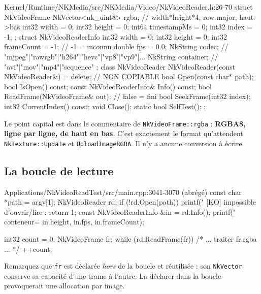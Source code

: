 \begin{nkcode}{Kernel/Runtime/NKMedia/src/NKMedia/Video/NkVideoReader.h:26-70}
    struct NkVideoFrame {
            NkVector<nk_uint8> rgba;         // width*height*4, row-major, haut->bas
            int32 width = 0;   int32 height = 0;
            int64 timestampMs = 0;
            int32 index = -1;
    };
    struct NkVideoReaderInfo {
            int32 width = 0;   int32 height = 0;
            int32 frameCount = -1;           // -1 = inconnu
            double fps = 0.0;
            NkString codec;                  // "mjpeg"|"rawrgb"|"h264"|"hevc"|"vp8"|"vp9"|...
            NkString container;              // "avi"|"mov"|"mp4"|"sequence"
    };
    class NkVideoReader {
            NkVideoReader(const NkVideoReader&) = delete;          // NON COPIABLE
            bool Open(const char* path);
            bool IsOpen() const;
            const NkVideoReaderInfo& Info() const;
            bool ReadFrame(NkVideoFrame& out);                      // false = fini
            bool SeekFrame(int32 index);
            int32 CurrentIndex() const;
            void Close();
            static bool SelfTest();
    };
\end{nkcode}

Le point capital est dans le commentaire de \texttt{NkVideoFrame::rgba} :
\textbf{RGBA8, ligne par ligne, de haut en bas}. C'est exactement le format
qu'attendent \texttt{NkTexture::Update} et \texttt{UploadImageRGBA}. Il n'y a
aucune conversion à écrire.

\subsection{La boucle de lecture}

\begin{nkcode}{Applications/NkVideoReadTest/src/main.cpp:3041-3070 (abrégé)}
    const char *path = argv[1];
    NkVideoReader rd;
    if (!rd.Open(path)) {
        printf("  [KO] impossible d'ouvrir/lire : %
        return 1;
    }
    const NkVideoReaderInfo &in = rd.Info();
    printf("  conteneur=%
           in.height, in.fps, in.frameCount);

    int32 count = 0;
    NkVideoFrame fr;
    while (rd.ReadFrame(fr)) {
        /* ... traiter fr.rgba ... */
        ++count;
    }
\end{nkcode}

Remarquez que \texttt{fr} est déclarée \emph{hors} de la boucle et réutilisée :
son \texttt{NkVector} conserve sa capacité d'une trame à l'autre. La déclarer
dans la boucle provoquerait une allocation par image.

